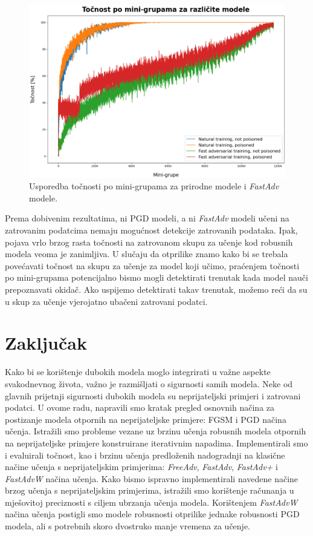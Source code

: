\documentclass[times, utf8, zavrsni, numeric]{fer}
\begin{document}
\begin{figure}[htb]
    \centering
    \includegraphics[scale=0.41]{../stats/train_accuracy_comparison_nat_fast.png}
    \caption{Usporedba točnosti po mini-grupama za prirodne modele i \textit{FastAdv} modele.}
    \label{fig:fast_nat_poisoned_comparison}
\end{figure}

Prema dobivenim rezultatima, ni PGD modeli, a ni \textit{FastAdv} modeli učeni na zatrovanim podatcima nemaju mogućnost detekcije zatrovanih podataka.
Ipak, pojava vrlo brzog rasta točnosti na zatrovanom skupu za učenje kod robusnih modela veoma je zanimljiva.
U slučaju da otprilike znamo kako bi se trebala povećavati točnost na skupu za učenje za model koji učimo, 
praćenjem točnosti po mini-grupama potencijalno bismo mogli detektirati trenutak kada model nauči prepoznavati okidač. 
Ako uspijemo detektirati takav trenutak, možemo reći da su u skup za učenje vjerojatno ubačeni zatrovani podatci.

\chapter{Zaključak}

Kako bi se korištenje dubokih modela moglo integrirati u važne aspekte svakodnevnog života, važno je razmišljati o sigurnosti samih modela. 
Neke od glavnih prijetnji sigurnosti dubokih modela su neprijateljski primjeri i zatrovani podatci.
U ovome radu, napravili smo kratak pregled osnovnih načina za postizanje modela otpornih na neprijateljske primjere: FGSM i PGD načina učenja.
Istražili smo probleme vezane uz brzinu učenja robusnih modela otpornih na neprijateljske primjere konstruirane iterativnim napadima.
Implementirali smo i evaluirali točnost, kao i brzinu učenja predloženih nadogradnji na klasične načine učenja s neprijateljskim primjerima: \textit{FreeAdv}, \textit{FastAdv}, \textit{FastAdv+} i \textit{FastAdvW} načina učenja.
Kako bismo ispravno implementirali navedene načine brzog učenja s neprijateljskim primjerima, istražili smo korištenje računanja u mješovitoj preciznosti s ciljem ubrzanja učenja modela.
Korištenjem \textit{FastAdvW} načina učenja postigli smo modele robusnosti otprilike jednake robusnosti PGD modela, ali s potrebnih skoro dvostruko manje vremena za učenje.
\end{document}
